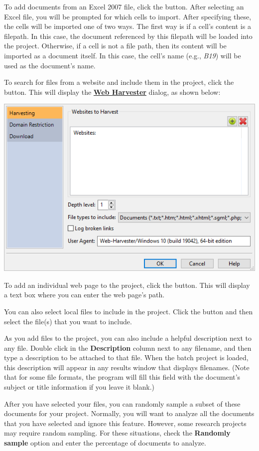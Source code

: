 \documentclass[
]{book}
\theoremstyle{definition}
\theoremstyle{definition}
\theoremstyle{definition}
\theoremstyle{definition}
\theoremstyle{remark}
\begin{document}
To add documents from an Excel 2007 file, click the  button. After selecting an Excel file, you will be prompted for which cells to import. After specifying these, the cells will be imported one of two ways. The first way is if a cell's content is a filepath. In this case, the document referenced by this filepath will be loaded into the project. Otherwise, if a cell is not a file path, then its content will be imported as a document itself. In this case, the cell's name (e.g., \emph{B19}) will be used as the document's name.

To search for files from a website and include them in the project, click the  button. This will display the \protect\hyperlink{web-harvester}{\textbf{Web Harvester}} dialog, as shown below:

\begin{center}\includegraphics[width=0.75\linewidth,]{Images/webharvester} \end{center}

To add an individual web page to the project, click the  button. This will display a text box where you can enter the web page's path.

You can also select local files to include in the project. Click the  button and then select the file(s) that you want to include.

As you add files to the project, you can also include a helpful description next to any file. Double click in the \textbf{Description} column next to any filename, and then type a description to be attached to that file. When the batch project is loaded, this description will appear in any results window that displays filenames. (Note that for some file formats, the program will fill this field with the document's subject or title information if you leave it blank.)

After you have selected your files, you can randomly sample a subset of these documents for your project. Normally, you will want to analyze all the documents that you have selected and ignore this feature. However, some research projects may require random sampling. For these situations, check the \textbf{Randomly sample} option and enter the percentage of documents to analyze.
\end{document}

